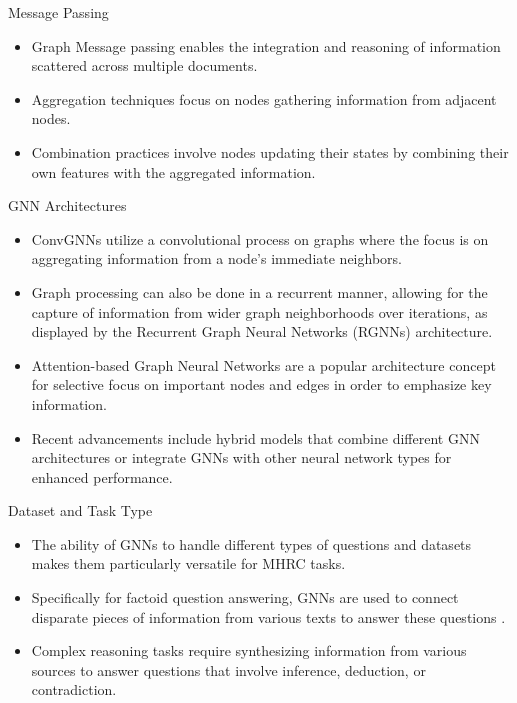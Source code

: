 \documentclass[10pt]{beamer}
\begin{document}
\begin{frame}[fragile]{Message Passing}
  \begin{itemize}
    \item Graph Message passing enables the integration and reasoning of information scattered across multiple documents.
    \item Aggregation techniques focus on nodes gathering information from adjacent nodes.
    \item Combination practices involve nodes updating their states by combining their own features with the aggregated information.
  \end{itemize}
\end{frame}

\begin{frame}[fragile]{GNN Architectures}
  \begin{itemize}
    \item ConvGNNs utilize a convolutional process on graphs where the focus is on aggregating information from a node's immediate neighbors.
    \item Graph processing can also be done in a recurrent manner, allowing for the capture of information from wider graph neighborhoods over iterations, as displayed by the Recurrent Graph Neural Networks (RGNNs) architecture.
    \item Attention-based Graph Neural Networks are a popular architecture concept for selective focus on important nodes and edges in order to emphasize key information.
    \item Recent advancements include hybrid models that combine different GNN architectures or integrate GNNs with other neural network types for enhanced performance.
  \end{itemize}
\end{frame}

\begin{frame}[fragile]{Dataset and Task Type}
  \begin{itemize}
    \item The ability of GNNs to handle different types of questions and datasets makes them particularly versatile for MHRC tasks.
    \item Specifically for factoid question answering, GNNs are used to connect disparate pieces of information from various texts to answer these questions \cite{RN116}.
    \item Complex reasoning tasks require synthesizing information from various sources to answer questions that involve inference, deduction, or contradiction.
  \end{itemize}
\end{frame}
\end{document}
